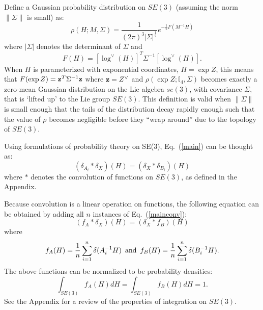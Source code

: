 \documentclass[twocolumn,10pt]{asme2ej}
\newcommand{\half}{\frac{1}{2}}
\begin{document}
Define a Gaussian probability distribution on $SE(3)$ (assuming the norm $\|\Sigma\|$ is small) as:
$$ \rho(H; M, \Sigma) = \frac{1}{(2\pi)^3 |\Sigma|^{\half}} e^{-\half F(M^{-1} H)} $$
where $|\Sigma|$ denotes the determinant of $\Sigma$ and
$$ F(H) = [\log^{\vee}(H)]^T \Sigma^{-1} [\log^{\vee}(H)]. $$
When $H$ is parameterized with exponential coordinates, $H = \exp Z$, this means that
$F(\exp Z) = {\bf z}^T \Sigma^{-1}  {\bf z}$ where ${\bf z} = Z^{\vee}$ and
$\rho(\exp Z; \mathbb{I}_4, \Sigma)$ becomes exactly a zero-mean Gaussian distribution on the Lie algebra $se(3)$, with covariance $\Sigma$, that is `lifted up' to the Lie group $SE(3)$. This definition is valid when $\|\Sigma\|$ is small enough that the tails of the distribution decay rapidly enough such that the value of $\rho$
becomes negligible before they ``wrap around'' due to the topology of $SE(3)$. 

Using formulations of probability theory on SE(3), Eq.~(\ref{main}) can be thought as:
\begin{equation} (\delta_{A_i} * \delta_X)(H) = (\delta_X * \delta_{B_i})(H) \label{mainconv} \end{equation}
where $*$ denotes the convolution of functions on $SE(3)$, as defined in the Appendix.

Because convolution is a linear operation on functions, the following equation can be obtained by adding all $n$ instances of Eq.~(\ref{mainconv}):
\begin{equation} (f_A * \delta_X)(H) = (\delta_X * f_B)(H) \label{mainconvall} \end{equation}
where $$ f_A(H) = \frac{1}{n} \sum_{i=1}^{n} \delta(A_i^{-1} H) \,\,\, {\rm and} \,\,\, f_B(H) = \frac{1}{n} \sum_{i=1}^{n} \delta(B_i^{-1} H). $$
The above functions can be normalized
to be probability densities:
$$ \int_{SE(3)} f_A(H) dH = \int_{SE(3)} f_B(H) dH = 1. $$
See the Appendix for a review of the properties of integration on $SE(3)$.
\end{document}

